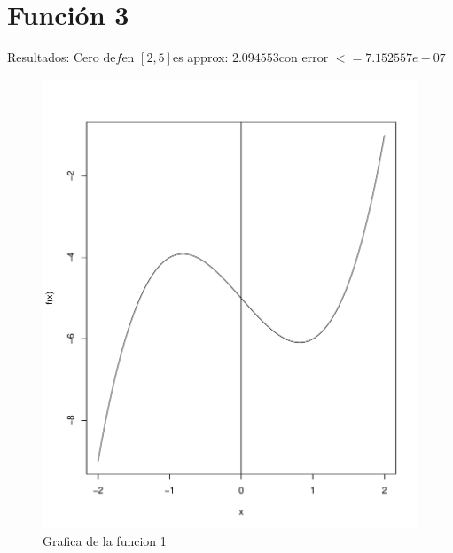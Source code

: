\documentclass[12pt,a4paper]{article}
\begin{document}
\section{Función 3}\label{sec:FUN3}

Resultados: Cero de$  f $en $[ 2 , 5 ] $es approx: $ 2.094553 $con error $<= 7.152557e-07 $

\begin{figure}
\centering
\includegraphics[scale=.8]{G3}
\caption{Grafica de la funcion 1}
\label{fig:G3}
\end{figure}
\end{document}
